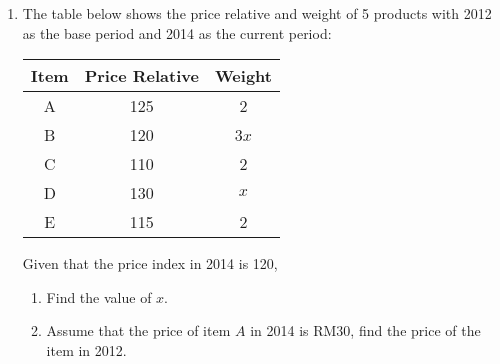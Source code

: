 \documentclass{report}
\begin{document}
\begin{multicols}{2}
\begin{enumerate}
    \item The table below shows the price relative and weight of 5 products with 2012 as
          the base period and 2014 as the current period:
          \begin{center}
            \begin{tabular}{|c|c|c|}
              \hline
              Item & Price Relative & Weight \\
              \hline
              A    & 125            & 2      \\
              B    & 120            & 3$x$   \\
              C    & 110            & 2      \\
              D    & 130            & $x$    \\
              E    & 115            & 2      \\
              \hline
            \end{tabular}
          \end{center}
          Given that the price index in 2014 is 120,
          \begin{enumerate}
            \item Find the value of $x$.
            \item Assume that the price of item $A$ in 2014 is RM30, find the price of the item
                  in 2012.
          \end{enumerate}


\end{enumerate}
\end{multicols}
\end{document}
